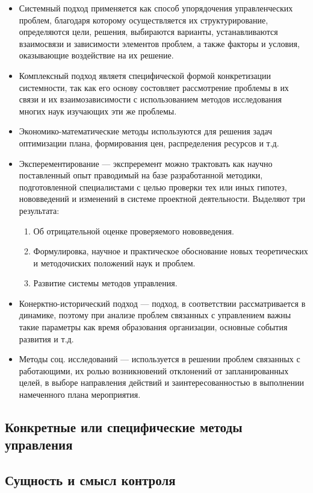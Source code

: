 \documentclass[a4paper,12pt,oneside,final]{extarticle}
\numberwithin{equation}{section}
\begin{document}
\begin{itemize}
	\item Системный подход применяется как способ упорядочения управленческих проблем, благодаря которому осуществляется их структурирование, определяются цели, решения, выбираются варианты, устанавливаются взаимосвязи и зависимости элементов проблем, а также факторы и условия, оказывающие воздействие на их решение.
	\item Комплексный подход являетя специфической формой конкретизации системности, так как его основу состовляет рассмотрение проблемы в их связи и их взаимозависимости с использованием методов исследования многих наук изучающих эти же проблемы. 
	\item Экономико-математические методы используются для решения задач оптимизации плана, формирования цен, распределения ресурсов и т.д.
	\item Эксперементирование --- экспреремент можно трактовать как научно поставленный опыт праводимый на базе разработанной методики, подготовленной специалистами с целью проверки тех или иных гипотез, нововведений и изменений в системе проектной деятельности. 
	Выделяют три результата:
	\begin{enumerate} 
		\item Об отрицательной оценке проверяемого нововведения.
		\item Формулировка, научное и практическое обоснование новых теоретических и методочиских положений наук и проблем. 
		\item Развитие системы методов управления.
	\end{enumerate}
	\item Конерктно-исторический подход --- подход, в соответствии рассматривается в динамике, поэтому при анализе проблем связанных с управлением важны такие параметры как время образования организации, основные события развития и т.д.
	\item Методы соц. исследований --- используется в решении проблем связанных с работающими, их ролью возникновений отклонений от запланированных целей, в выборе направления действий и заинтересованностью в выполнении намеченного плана мероприятия. 
\end{itemize}

\subsection{Конкретные или специфические методы управления}

\subsection{Сущность и смысл контроля}
\end{document}
